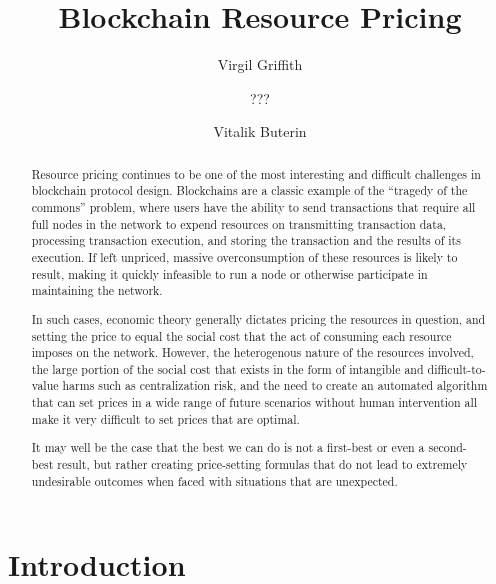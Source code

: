 \documentclass[12pt, final]{article}
\author{Virgil Griffith}
\author{???}
\author{Vitalik Buterin}
\affil{Ethereum Foundation}
\title{Blockchain Resource Pricing}
\begin{document}
\maketitle
\vspace{-0.2in} \TODO{\today}





\begin{abstract}
 Resource pricing continues to be one of the most interesting and difficult challenges in blockchain protocol design. Blockchains are a classic example of the ``tragedy of the commons'' problem, where users have the ability to send transactions that require all full nodes in the network to expend resources on transmitting transaction data, processing transaction execution, and storing the transaction and the results of its execution. If left unpriced, massive overconsumption of these resources is likely to result, making it quickly infeasible to run a node or otherwise participate in maintaining the network.

In such cases, economic theory generally dictates pricing the resources in question, and setting the price to equal the social cost that the act of consuming each resource imposes on the network. However, the heterogenous nature of the resources involved, the large portion of the social cost that exists in the form of intangible and difficult-to-value harms such as centralization risk, and the need to create an automated algorithm that can set prices in a wide range of future scenarios without human intervention all make it very difficult to set prices that are optimal.

It may well be the case that the best we can do is not a first-best or even a second-best result, but rather creating price-setting formulas that do not lead to extremely undesirable outcomes when faced with situations that are unexpected.
\end{abstract}

\section{Introduction}
\end{document}
